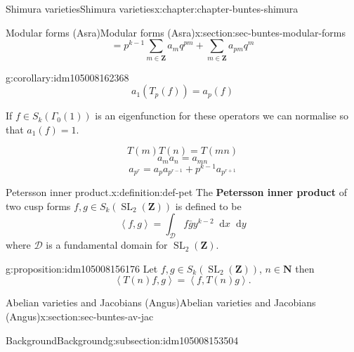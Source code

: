 \documentclass[oneside,10pt,]{book}
\newcommand{\terminology}[1]{\textbf{#1}}
\numberwithin{equation}{section}
\newcommand{\diff}{\mathop{}\!\mathrm{d}}
\newcommand{\pair}[2]{\left\langle #1, #2 \right\rangle}
\newcommand{\NN}{\mathbf{N}}
\newcommand{\ZZ}{\mathbf{Z}}
\DeclareMathOperator{\SL}{SL}
\begin{document}
\begin{chapterptx}{Shimura varieties}{}{Shimura varieties}{}{}{x:chapter:chapter-buntes-shimura}
\begin{sectionptx}{Modular forms (Asra)}{}{Modular forms (Asra)}{}{}{x:section:sec-buntes-modular-forms}
\begin{equation*}
\end{equation*}
%
\begin{equation*}
= p^{k-1} \sum_{m\in \ZZ} a_m q^{pm} +\sum_{m\in \ZZ} a_{pm}q^m
\end{equation*}
%
\begin{corollary}{}{}{g:corollary:idm105008162368}%
%
\begin{equation*}
a_1(T_p(f)) = a_p(f)
\end{equation*}
%
\end{corollary}
If \(f\in S_k(\Gamma_0(1))\) is an eigenfunction for these operators we can normalise so that \(a_1(f) = 1\).%
\par
%
\begin{equation*}
T(m)T(n) = T(mn)
\end{equation*}
%
\begin{equation*}
a_ma_n = a_{mn}
\end{equation*}
%
\begin{equation*}
a_{p^r} = a_p a_{p^{r-1}} + p^{k-1} a_{p^{r+1}}
\end{equation*}
%
\begin{definition}{Petersson inner product.}{x:definition:def-pet}%
The \terminology{Petersson inner product} of two cusp forms \(f,g\in S_k(\SL_2(\ZZ))\) is defined to be%
\begin{equation*}
\pair{f}{g} = \int_{\mathcal D} f \bar g y^{k-2} \diff x \diff y
\end{equation*}
where \(\mathcal D\) is a fundamental domain for \(\SL_2(\ZZ)\).%
\end{definition}
\begin{proposition}{}{}{g:proposition:idm105008156176}%
Let \(f,g\in S_k(\SL_2(\ZZ))\), \(n\in \NN\) then%
\begin{equation*}
\pair{T(n) f}{g} = \pair{f}{T(n)g}\text{.}
\end{equation*}
%
\end{proposition}
\end{sectionptx}
%
%
\typeout{************************************************}
\typeout{************************************************}
%
\begin{sectionptx}{Abelian varieties and Jacobians (Angus)}{}{Abelian varieties and Jacobians (Angus)}{}{}{x:section:sec-buntes-av-jac}
%
%
\typeout{************************************************}
\typeout{************************************************}
%
\begin{subsectionptx}{Background}{}{Background}{}{}{g:subsection:idm105008153504}

\end{subsectionptx}
\end{sectionptx}
\end{chapterptx}
\end{document}
